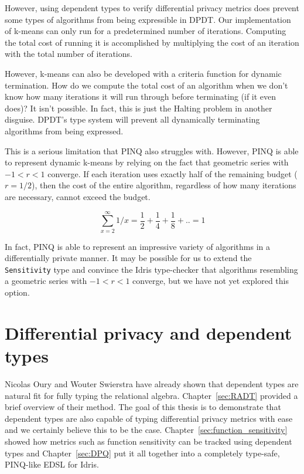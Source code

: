 \documentclass[12pt]{report}
\begin{document}
However, using dependent types to verify differential privacy metrics does prevent some types of algorithms from being expressible in DPDT.
Our implementation of k-means can only run for a predetermined number of iterations.
Computing the total cost of running it is accomplished by multiplying the cost of an iteration with the total number of iterations.

However, k-means can also be developed with a criteria function for dynamic termination.
How do we compute the total cost of an algorithm when we don't know how many iterations it will run through before terminating (if it even does)?
It isn't possible.
In fact, this is just the Halting problem in another disguise.
DPDT's type system will prevent all dynamically terminating algorithms from being expressed.

This is a serious limitation that PINQ also struggles with.
However, PINQ is able to represent dynamic k-means by relying on the fact that geometric series with $-1 < r < 1$ converge.
If each iteration uses exactly half of the remaining budget ($r=1/2$), then the cost of the entire algorithm, regardless of how many iterations are necessary, cannot exceed the budget.

$$\sum_{x=2}^{\infty} 1/x = \frac{1}{2} + \frac{1}{4} + \frac{1}{8} + .. = 1$$

In fact, PINQ is able to represent an impressive variety of algorithms in a differentially private manner.
It may be possible for us to extend the \texttt{Sensitivity} type and convince the Idris type-checker that algorithms resembling a geometric series with $-1 < r < 1$ converge, but we have not yet explored this option.

\section{Differential privacy and dependent types}

Nicolas Oury and Wouter Swierstra have already shown that dependent types are natural fit for fully typing the relational algebra\cite{OurySwierstra08PowerOfPi}.
Chapter~\ref{sec:RADT} provided a brief overview of their method.
The goal of this thesis is to demonstrate that dependent types are also capable of typing differential privacy metrics with ease and we certainly believe this to be the case.
Chapter~\ref{sec:function_sensitivity} showed how metrics such as function sensitivity can be tracked using dependent types and Chapter~\ref{sec:DPQ} put it all together into a completely type-safe, PINQ-like EDSL for Idris.
\end{document}
